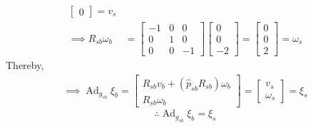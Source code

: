 \begin{align*}
\begin{bmatrix}
        0
    \end{bmatrix}
    =
    v_s
    \\
    \implies
    R_{s b} \omega_b
     & =
    \begin{bmatrix}
        -1 & 0 & 0  \\
        0  & 1 & 0  \\
        0  & 0 & -1
    \end{bmatrix}
    \begin{bmatrix}
        0 \\
        0 \\
        -2
    \end{bmatrix}
    =
    \begin{bmatrix}
        0 \\
        0 \\
        2
    \end{bmatrix}
    =
    \omega_s
\end{align*}
Thereby,
\begin{align*}
    \implies
    \operatorname{Ad}_{g_{s b}} \xi_{b}
    =
    \begin{bmatrix}
        R_{s b} v_b + (\widehat{p}_{s b} R_{s b}) \omega_b \\
        R_{s b} \omega_b
    \end{bmatrix}
    =
    \begin{bmatrix}
        v_s \\
        \omega_s
    \end{bmatrix}
    =
    \xi_s
\end{align*}
\begin{equation*}
    \therefore
    \boxed{
    \operatorname{Ad}_{g_{s b}} \xi_{b}
    =
    \xi_s
    }
\end{equation*}
